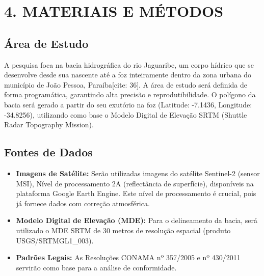 \documentclass[12pt, a4paper]{article}
\begin{document}

\section*{4. MATERIAIS E MÉTODOS}

\subsection{Área de Estudo}
A pesquisa foca na bacia hidrográfica do rio Jaguaribe, um corpo hídrico que se desenvolve desde sua nascente até a foz inteiramente dentro da zona urbana do município de João Pessoa, Paraíba[cite: 36]. A área de estudo será definida de forma programática, garantindo alta precisão e reprodutibilidade. O polígono da bacia será gerado a partir do seu exutório na foz (Latitude: -7.1436, Longitude: -34.8256), utilizando como base o Modelo Digital de Elevação SRTM (Shuttle Radar Topography Mission).

\subsection{Fontes de Dados}
\begin{itemize}
    \item \textbf{Imagens de Satélite:} Serão utilizadas imagens do satélite Sentinel-2 (sensor MSI), Nível de processamento 2A (reflectância de superfície), disponíveis na plataforma Google Earth Engine. Este nível de processamento é crucial, pois já fornece dados com correção atmosférica.
    \item \textbf{Modelo Digital de Elevação (MDE):} Para o delineamento da bacia, será utilizado o MDE SRTM de 30 metros de resolução espacial (produto USGS/SRTMGL1\_003).
    \item \textbf{Padrões Legais:} As Resoluções CONAMA nº 357/2005 e nº 430/2011 servirão como base para a análise de conformidade.
\end{itemize}
\end{document}
